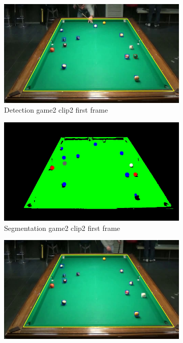 \begin{figure}[H]
    \centering
    \begin{subfigure}[b]{0.35\textwidth}
        \centering
        \includegraphics[width=\textwidth]{images/Detection/game2_clip2_detected_balls_first_frame.jpg}
        \caption{Detection game2 clip2 first frame}
        \label{fig: game2_clip2_first_frame_detected}
    \end{subfigure}
    \begin{subfigure}[b]{0.35\textwidth}
        \centering
        \includegraphics[width=\textwidth]{images/Segmentation/game2_clip2_segmented_balls_first_frame.jpg}
        \caption{Segmentation game2 clip2 first frame}
		\label{fig: game2_clip2_first_frame_segmented}
    \end{subfigure}
    \begin{subfigure}[b]{0.35\textwidth}
        \centering
        \includegraphics[width=\textwidth]{images/Detection/game2_clip2_detected_balls_last_frame.jpg}

\end{subfigure}
\end{figure}
